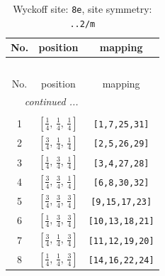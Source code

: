 \documentclass[fleqn,8pt]{jsarticle}
\begin{document}
\renewcommand{\arraystretch}{1.2}
\begin{longtable}{ccc}
\caption{Wyckoff site: {\tt 8e}, site symmetry: {\tt ..2/m}}
 \\
 \hline \hline
No. & position & mapping \\ \hline \endfirsthead

\multicolumn{2}{l}{\tablename\ \thetable{}} \\
 \hline \hline
No. & position & mapping \\ \hline \endhead

 \hline \hline
\multicolumn{2}{r}{\footnotesize\it continued ...} \\ \endfoot

 \hline \hline
\multicolumn{2}{r}{} \\ \endlastfoot

1 & $\left[ \frac{1}{4},\, \frac{1}{4},\, \frac{1}{4} \right]$ & {\tt [1,7,25,31]} \\ \hline
2 & $\left[ \frac{3}{4},\, \frac{1}{4},\, \frac{1}{4} \right]$ & {\tt [2,5,26,29]} \\ \hline
3 & $\left[ \frac{1}{4},\, \frac{3}{4},\, \frac{1}{4} \right]$ & {\tt [3,4,27,28]} \\ \hline
4 & $\left[ \frac{3}{4},\, \frac{3}{4},\, \frac{1}{4} \right]$ & {\tt [6,8,30,32]} \\ \hline
5 & $\left[ \frac{3}{4},\, \frac{3}{4},\, \frac{3}{4} \right]$ & {\tt [9,15,17,23]} \\ \hline
6 & $\left[ \frac{1}{4},\, \frac{3}{4},\, \frac{3}{4} \right]$ & {\tt [10,13,18,21]} \\ \hline
7 & $\left[ \frac{3}{4},\, \frac{1}{4},\, \frac{3}{4} \right]$ & {\tt [11,12,19,20]} \\ \hline
8 & $\left[ \frac{1}{4},\, \frac{1}{4},\, \frac{3}{4} \right]$ & {\tt [14,16,22,24]} \\
\end{longtable}
\renewcommand{\arraystretch}{1.2}
\end{document}
